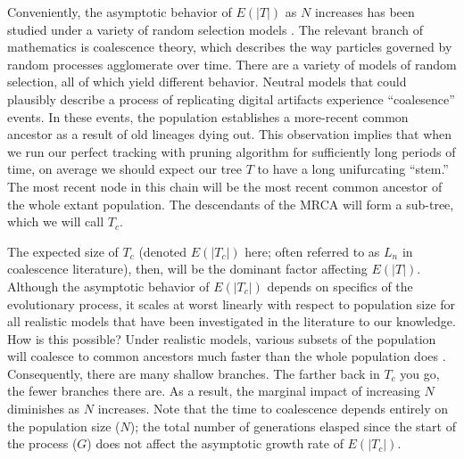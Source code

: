 Conveniently, the asymptotic behavior of $E(|T|)$ as $N$ increases has been studied under a variety of random selection models \citep{berestyckiRecentProgressCoalescent2009, tellierCoalescenceMultipleBranching2014, nordborgCoalescentTheory2019}.
The relevant branch of mathematics is coalescence theory, which describes the way particles governed by random processes agglomerate over time.
There are a variety of models of random selection, all of which yield different behavior.
Neutral models that could plausibly describe a process of replicating digital artifacts experience ``coalesence'' events.
In these events, the population establishes a more-recent common ancestor as a result of old lineages dying out.
This observation implies that when we run our perfect tracking with pruning algorithm for sufficiently long periods of time, on average we should expect our tree $T$ to have a long unifurcating ``stem.''
The most recent node in this chain will be the most recent common ancestor of the whole extant population.
The descendants of the MRCA will form a sub-tree, which we will call $T_c$.

The expected size of $T_c$ (denoted $E(|T_c|)$ here; often referred to as $L_n$ in coalescence literature), then, will be the dominant factor affecting $E(|T|)$.
Although the asymptotic behavior of $E(|T_c|)$ depends on specifics of the evolutionary process, it scales at worst linearly with respect to population size for all realistic models that have been investigated in the literature to our knowledge.  %
How is this possible?
Under realistic models, various subsets of the population will coalesce to common ancestors much faster than the whole population does \citep{nordborgCoalescentTheory2019}.
Consequently, there are many shallow branches.
The farther back in $T_c$ you go, the fewer branches there are.
As a result, the marginal impact of increasing $N$ diminishes as $N$ increases. 
Note that the time to coalescence depends entirely on the population size ($N$); the total number of generations elasped since the start of the process ($G$) does not affect the asymptotic growth rate of $E(|T_c|)$.


